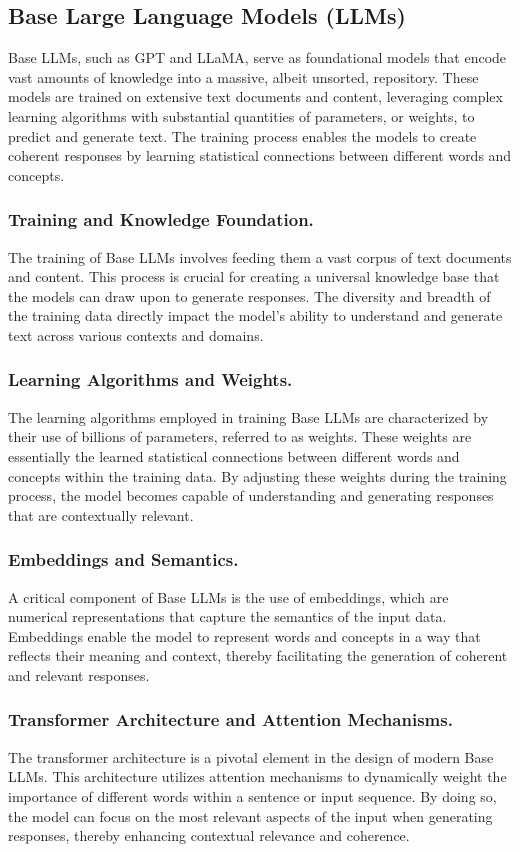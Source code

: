 \documentclass{article}
\begin{document}
\subsection{Base Large Language Models (LLMs)}
Base LLMs, such as GPT and LLaMA, serve as foundational models that encode vast amounts of knowledge into a massive, albeit unsorted, repository. These models are trained on extensive text documents and content, leveraging complex learning algorithms with substantial quantities of parameters, or weights, to predict and generate text. The training process enables the models to create coherent responses by learning statistical connections between different words and concepts.

\subsubsection{Training and Knowledge Foundation.} The training of Base LLMs involves feeding them a vast corpus of text documents and content. This process is crucial for creating a universal knowledge base that the models can draw upon to generate responses. The diversity and breadth of the training data directly impact the model’s ability to understand and generate text across various contexts and domains.

\subsubsection{Learning Algorithms and Weights.} The learning algorithms employed in training Base LLMs are characterized by their use of billions of parameters, referred to as weights. These weights are essentially the learned statistical connections between different words and concepts within the training data. By adjusting these weights during the training process, the model becomes capable of understanding and generating responses that are contextually relevant.

\subsubsection{Embeddings and Semantics.} A critical component of Base LLMs is the use of embeddings, which are numerical representations that capture the semantics of the input data. Embeddings enable the model to represent words and concepts in a way that reflects their meaning and context, thereby facilitating the generation of coherent and relevant responses.

\subsubsection{Transformer Architecture and Attention Mechanisms.} The transformer architecture is a pivotal element in the design of modern Base LLMs. This architecture utilizes attention mechanisms to dynamically weight the importance of different words within a sentence or input sequence. By doing so, the model can focus on the most relevant aspects of the input when generating responses, thereby enhancing contextual relevance and coherence.
\end{document}

